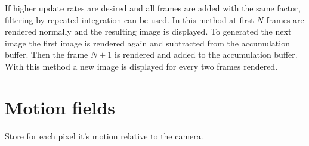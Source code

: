 If higher update rates are desired and all frames are added with the same factor, filtering by repeated integration can be used.
In this method at first $N$ frames are rendered normally and the resulting image is displayed.
To generated the next image the first image is rendered again and subtracted from the accumulation buffer.
Then the frame $N+1$ is rendered and added to the accumulation buffer.
With this method a new image is displayed for every two frames rendered.\cite{Heckbert.1986}

\section{Motion fields}
Store for each pixel it's motion relative to the camera.
